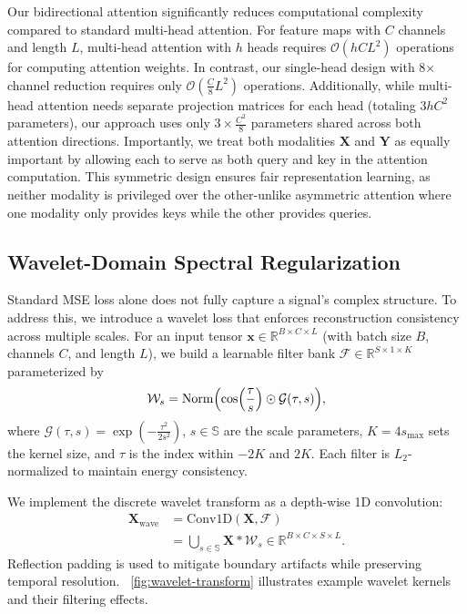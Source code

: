 \documentclass[conference]{IEEEtran}
\begin{document}
Our bidirectional attention significantly reduces computational complexity compared to standard multi-head attention. For feature maps with $C$ channels and length $L$, multi-head attention with $h$ heads requires $\mathcal{O}(hCL^2)$ operations for computing attention weights. In contrast, our single-head design with 8× channel reduction requires only $\mathcal{O}(\frac{C}{8}L^2)$ operations. Additionally, while multi-head attention needs separate projection matrices for each head (totaling $3hC^2$ parameters), our approach uses only $3 \times \frac{C^2}{8}$ parameters shared across both attention directions. Importantly, we treat both modalities $\mathbf{X}$ and $\mathbf{Y}$ as equally important by allowing each to serve as both query and key in the attention computation. This symmetric design ensures fair representation learning, as neither modality is privileged over the other-unlike asymmetric attention where one modality only provides keys while the other provides queries. 



\subsection{Wavelet-Domain Spectral Regularization}
\label{subsec:wavelet}

Standard MSE loss alone does not fully capture a signal's complex structure. To address this, we introduce a wavelet loss that enforces reconstruction consistency across multiple scales. For an input tensor $\mathbf{x}\in\mathbb{R}^{B\times C\times L}$ (with batch size $B$, channels $C$, and length $L$), we build a learnable filter bank $\mathcal{F}\in\mathbb{R}^{S\times 1\times K}$ parameterized by
\begin{equation}
    \label{eq:wavelet}
    \mathcal{W}_s = \operatorname{Norm}\Bigl(\cos\Bigl(\frac{\tau}{s}\Bigr) \odot \mathcal{G}(\tau,s)\Bigr),
\end{equation}
where $\mathcal{G}(\tau,s)=\exp\left(-\frac{\tau^2}{2s^2}\right)$, $s\in\mathbb{S}$ are the scale parameters, $K=4s_{\text{max}}$ sets the kernel size, and $\tau$ is the index within $-2K$ and $2K$. Each filter is $L_2$-normalized to maintain energy consistency.

We implement the discrete wavelet transform as a depth-wise 1D convolution:
\begin{equation}
    \begin{aligned}
        \mathbf{X}_{\text{wave}} & = \text{Conv1D}(\mathbf{X}, \mathcal{F})                                                            \\
                                 & = \bigcup_{s\in\mathbb{S}} \mathbf{X}\ast \mathcal{W}_s \in \mathbb{R}^{B\times C\times S\times L}.
    \end{aligned}
\end{equation}
Reflection padding is used to mitigate boundary artifacts while preserving temporal resolution. \figurename~\ref{fig:wavelet-transform} illustrates example wavelet kernels and their filtering effects.
\end{document}
